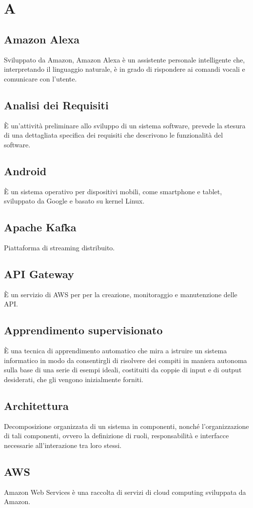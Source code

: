 \section*{A}

\subsection{Amazon Alexa}
Sviluppato da Amazon, Amazon Alexa è un assistente personale intelligente che, interpretando il linguaggio naturale, è in grado di rispondere ai comandi vocali e comunicare con l'utente. 

\subsection{Analisi dei Requisiti}
È un'attività preliminare allo sviluppo di un sistema software, prevede la stesura di una dettagliata specifica dei requisiti che descrivono le funzionalità del software.

\subsection{Android}
È un sistema operativo per dispositivi mobili, come smartphone e tablet, sviluppato da Google e basato su kernel Linux.

\subsection{Apache Kafka}
Piattaforma di streaming distribuito.

\subsection{API Gateway}
È un servizio di AWS per per la creazione, monitoraggio e manutenzione delle API.

\subsection{Apprendimento supervisionato}
È una tecnica di apprendimento automatico che mira a istruire un sistema informatico in modo da consentirgli di risolvere dei compiti in maniera autonoma sulla base di una serie di esempi ideali, costituiti da coppie di input e di output desiderati, che gli vengono inizialmente forniti.

\subsection{Architettura}
Decomposizione organizzata di un sistema in componenti, nonché l'organizzazione di tali componenti, ovvero la definizione di ruoli, responsabilità e interfacce necessarie all'interazione tra loro stessi.

\subsection{AWS}
Amazon Web Services è una raccolta di servizi di cloud computing sviluppata da Amazon.